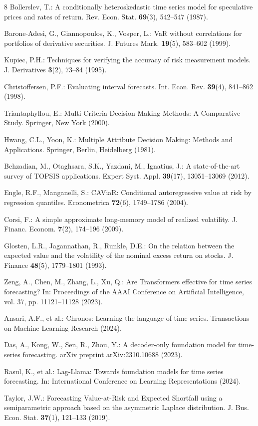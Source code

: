 \documentclass[runningheads]{llncs}
\begin{document}
\begin{thebibliography}{8}
Bollerslev, T.: A conditionally heteroskedastic time series model for speculative prices and rates of return. Rev. Econ. Stat. \textbf{69}(3), 542--547 (1987).

Barone-Adesi, G., Giannopoulos, K., Vosper, L.: VaR without correlations for portfolios of derivative securities. J. Futures Mark. \textbf{19}(5), 583--602 (1999).

Kupiec, P.H.: Techniques for verifying the accuracy of risk measurement models. J. Derivatives \textbf{3}(2), 73--84 (1995).

Christoffersen, P.F.: Evaluating interval forecasts. Int. Econ. Rev. \textbf{39}(4), 841--862 (1998).

Triantaphyllou, E.: Multi-Criteria Decision Making Methods: A Comparative Study. Springer, New York (2000).

Hwang, C.L., Yoon, K.: Multiple Attribute Decision Making: Methods and Applications. Springer, Berlin, Heidelberg (1981).

Behzadian, M., Otaghsara, S.K., Yazdani, M., Ignatius, J.: A state-of-the-art survey of TOPSIS applications. Expert Syst. Appl. \textbf{39}(17), 13051--13069 (2012).

Engle, R.F., Manganelli, S.: CAViaR: Conditional autoregressive value at risk by regression quantiles. Econometrica \textbf{72}(6), 1749--1786 (2004).

Corsi, F.: A simple approximate long-memory model of realized volatility. J. Financ. Econom. \textbf{7}(2), 174--196 (2009).

Glosten, L.R., Jagannathan, R., Runkle, D.E.: On the relation between the expected value and the volatility of the nominal excess return on stocks. J. Finance \textbf{48}(5), 1779--1801 (1993).

Zeng, A., Chen, M., Zhang, L., Xu, Q.: Are Transformers effective for time series forecasting? In: Proceedings of the AAAI Conference on Artificial Intelligence, vol. 37, pp. 11121--11128 (2023).

Ansari, A.F., et al.: Chronos: Learning the language of time series. Transactions on Machine Learning Research (2024).

Das, A., Kong, W., Sen, R., Zhou, Y.: A decoder-only foundation model for time-series forecasting. arXiv preprint arXiv:2310.10688 (2023).

Rasul, K., et al.: Lag-Llama: Towards foundation models for time series forecasting. In: International Conference on Learning Representations (2024).

Taylor, J.W.: Forecasting Value-at-Risk and Expected Shortfall using a semiparametric approach based on the asymmetric Laplace distribution. J. Bus. Econ. Stat. \textbf{37}(1), 121--133 (2019).

\end{thebibliography}
\end{document}
